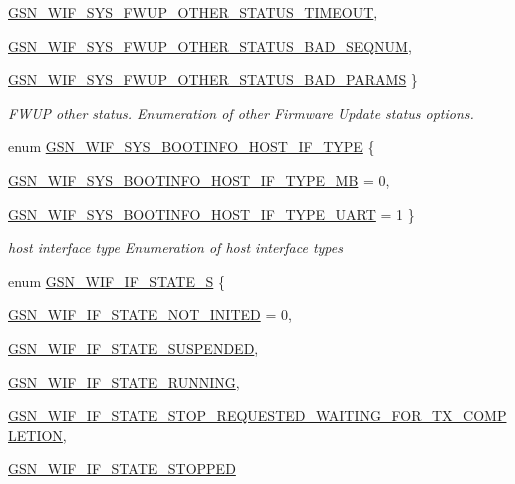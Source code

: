 \begin{DoxyCompactItemize}
\par
\hyperlink{a00639_gga8df4566faa9edce0748124e2d08c1efeabf7f11d1ce41bb8d8cba0dff0b3df92a}{GSN\_\-WIF\_\-SYS\_\-FWUP\_\-OTHER\_\-STATUS\_\-TIMEOUT}, 
\par
\hyperlink{a00639_gga8df4566faa9edce0748124e2d08c1efeaa6cd7e26354e8e53f8a1cb9c94a7ad54}{GSN\_\-WIF\_\-SYS\_\-FWUP\_\-OTHER\_\-STATUS\_\-BAD\_\-SEQNUM}, 
\par
\hyperlink{a00639_gga8df4566faa9edce0748124e2d08c1efead2bdb2dd956827ac45f9dab635622eae}{GSN\_\-WIF\_\-SYS\_\-FWUP\_\-OTHER\_\-STATUS\_\-BAD\_\-PARAMS}
 \}
\begin{DoxyCompactList}\small\item\em FWUP other status. Enumeration of other Firmware Update status options. \end{DoxyCompactList}\item 
enum \hyperlink{a00639_gaa1aae8d2007a2f4b746672dbc9c8efbb}{GSN\_\-WIF\_\-SYS\_\-BOOTINFO\_\-HOST\_\-IF\_\-TYPE} \{ \par
\hyperlink{a00639_ggaa1aae8d2007a2f4b746672dbc9c8efbbaef814f4355ae06b21e9b99429e4e32e1}{GSN\_\-WIF\_\-SYS\_\-BOOTINFO\_\-HOST\_\-IF\_\-TYPE\_\-MB} =  0, 
\par
\hyperlink{a00639_ggaa1aae8d2007a2f4b746672dbc9c8efbba9d391bc48ffc1354dc5af474787f9f09}{GSN\_\-WIF\_\-SYS\_\-BOOTINFO\_\-HOST\_\-IF\_\-TYPE\_\-UART} =  1
 \}
\begin{DoxyCompactList}\small\item\em host interface type Enumeration of host interface types \end{DoxyCompactList}\item 
enum \hyperlink{a00639_ga5b5ea6b444509449484db8bf22612b98}{GSN\_\-WIF\_\-IF\_\-STATE\_\-S} \{ \par
\hyperlink{a00639_gga5b5ea6b444509449484db8bf22612b98aa658b0b0b1fc66453cc3aabbf296110e}{GSN\_\-WIF\_\-IF\_\-STATE\_\-NOT\_\-INITED} =  0, 
\par
\hyperlink{a00639_gga5b5ea6b444509449484db8bf22612b98aef6747e4a65b293ee9bee94928ec1e1a}{GSN\_\-WIF\_\-IF\_\-STATE\_\-SUSPENDED}, 
\par
\hyperlink{a00639_gga5b5ea6b444509449484db8bf22612b98a53425b647ada0e1a9e599d699b20cebf}{GSN\_\-WIF\_\-IF\_\-STATE\_\-RUNNING}, 
\par
\hyperlink{a00639_gga5b5ea6b444509449484db8bf22612b98a772f04af861bc5f56c255305c5354365}{GSN\_\-WIF\_\-IF\_\-STATE\_\-STOP\_\-REQUESTED\_\-WAITING\_\-FOR\_\-TX\_\-COMPLETION}, 
\par
\hyperlink{a00639_gga5b5ea6b444509449484db8bf22612b98a993c121d2959bd02efde4f10104b0ad3}{GSN\_\-WIF\_\-IF\_\-STATE\_\-STOPPED}

\end{DoxyCompactItemize}
